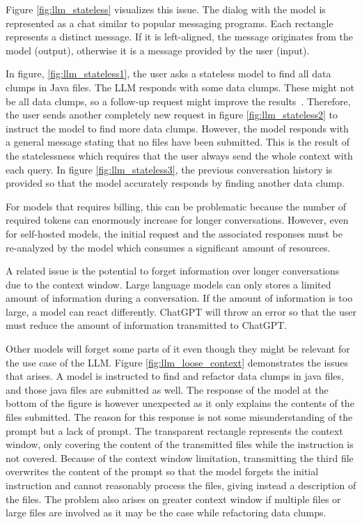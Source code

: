 {Figure \ref{fig:llm_stateless} visualizes this issue. The dialog with the model is represented as a chat similar to popular messaging programs. Each rectangle represents a distinct message. If it is left-aligned, the message originates from the model (output), otherwise it is a message provided by the user (input). 

In figure, \ref{fig:llm_stateless1}, the user asks a stateless model to find all data clumps in Java files. The \ac{LLM} responds with some data clumps. These might not be all data clumps, so a follow-up request might improve the results~\cite{10062688}. Therefore, the user sends another completely new request in figure \ref{fig:llm_stateless2} to instruct the model to find more data clumps. However, the model responds with a general message stating that no files have been submitted. This is the result of the statelessness which requires that the user always send the whole context with each query. In figure \ref{fig:llm_stateless3}, the previous conversation history is provided so that the model accurately responds by finding another data clump.

For models that requires billing, this can be problematic  because the number of required tokens can enormously increase for longer conversations. However, even for self-hosted models, the initial request and the associated responses must be re-analyzed by the model which  consumes a significant amount of resources.


A related issue is the potential to forget information over longer conversations due to the context window. Large language models can only stores a limited amount of information during a conversation. If the amount of information is too large,  a model can react differently. ChatGPT will throw an error so that the user must reduce the amount of information transmitted to ChatGPT.

Other models will forget some parts of it even though they might be relevant for the use case of the \ac{LLM}. Figure \ref{fig:llm_loose_context} demonstrates the issues that arises.  A model is instructed to find and refactor data clumps in java files, and those java files are submitted as well. The response of the model at the bottom of the figure is however unexpected as it only explains the contents of the files submitted. The reason for this response is not some misunderstanding of the prompt but a lack of prompt. The transparent rectangle represents the context window, only covering the content of the transmitted files while the instruction is not covered. 
Because of the context window limitation, transmitting the third file overwrites the content of the prompt so that the model forgets the initial instruction and cannot reasonably process the files, giving instead a description of the files. The problem also arises on greater context window if multiple files or large files are involved as it may be the case while refactoring data clumps.

}
